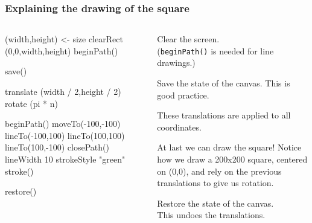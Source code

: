\documentclass{beamer}
\begin{document}
\begin{frame}[fragile]
\frametitle{Explaining the drawing of the square}

\tiny

\begin{columns}[t]
\begin{column}{0.5\textwidth}

\begin{codeblock}[0.8]
\begin{semiverbatim}
(width,height) <- size
clearRect (0,0,width,height)
beginPath()
\end{semiverbatim}
\end{codeblock}

\begin{codeblock}[0.8]
\begin{semiverbatim}
save()
\end{semiverbatim}
\end{codeblock}

\begin{codeblock}[0.8]
\begin{semiverbatim}
translate (width / 2,height / 2)
rotate (pi * n)
\end{semiverbatim}
\end{codeblock}

\begin{codeblock}[0.8]
\begin{semiverbatim}
beginPath()
moveTo(-100,-100)
lineTo(-100,100)
lineTo(100,100)
lineTo(100,-100)
closePath()
lineWidth 10
strokeStyle "green"
stroke()
\end{semiverbatim}
\end{codeblock}

\begin{codeblock}[0.8]
\begin{semiverbatim}
restore()
\end{semiverbatim}
\end{codeblock}

\end{column}
\begin{column}{0.4\textwidth}

\vskip 10pt
\noindent
Clear the screen.\\
({\tt beginPath()} is needed for line drawings.)

\vskip 25pt
\noindent
Save the state of the canvas. This is good practice.


\vskip 20pt
\noindent
These translations are applied to all coordinates.

\vskip 25pt
\noindent
At last we can draw the square!  Notice how we draw
a 200x200 square, centered on (0,0), 
and rely on the previous translations
to give us rotation.

\vskip 55pt
\noindent
Restore the state of the canvas.\\
This undoes the translations.

\end{column}
\end{columns} 
\end{frame}
\end{document}
